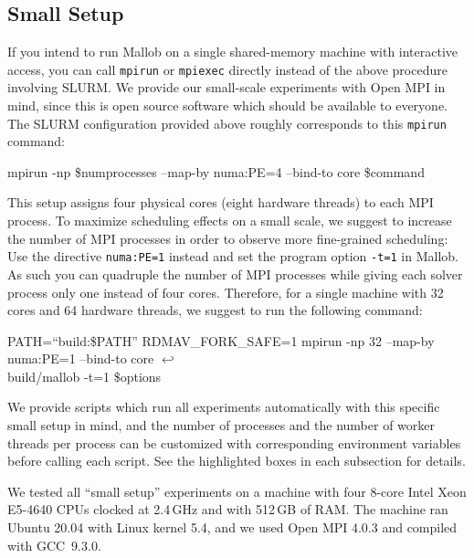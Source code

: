 \documentclass[runningheads]{article}
\newcommand{\CR}{{\tiny$\hookleftarrow$}}
\numberwithin{dummy}{subsection}
\begin{document}
\subsection{Small Setup}
\label{sec:small-setup}

If you intend to run Mallob on a single shared-memory machine with interactive access, you can call \texttt{mpirun} or \texttt{mpiexec} directly instead of the above procedure involving SLURM.
We provide our small-scale experiments with Open MPI in mind, since this is open source software which should be available to everyone.
The SLURM configuration provided above roughly corresponds to this \texttt{mpirun} command:

\begin{ttfenv}
mpirun -np \$numprocesses --map-by numa:PE=4 --bind-to core \$command
\end{ttfenv}

This setup assigns four physical cores (eight hardware threads) to each MPI process.
To maximize scheduling effects on a small scale, we suggest to increase the number of MPI processes in order to observe more fine-grained scheduling: 
Use the directive \texttt{numa:PE=1} instead and set the program option \texttt{-t=1} in Mallob.
As such you can quadruple the number of MPI processes while giving each solver process only one instead of four cores.
Therefore, for a single machine with 32 cores and 64 hardware threads, we suggest to run the following command:

\begin{ttfenv}
PATH=``build:\$PATH'' RDMAV\_FORK\_SAFE=1 mpirun -np 32 --map-by numa:PE=1 --bind-to core \CR\\
\hspace*{0.3cm}build/mallob -t=1 \$options
\end{ttfenv}

We provide scripts which run all experiments automatically with this specific small setup in mind, and the number of processes and the number of worker threads per process can be customized with corresponding environment variables before calling each script. 
See the highlighted boxes in each subsection for details.

We tested all ``small setup'' experiments on a machine with four 8-core Intel Xeon E5-4640 CPUs clocked at 2.4\,GHz and with 512\,GB of RAM.
The machine ran Ubuntu 20.04 with Linux kernel 5.4, and we used Open MPI 4.0.3 and compiled with GCC~9.3.0.
\end{document}
